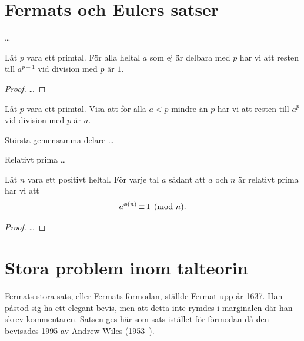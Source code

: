 \section{Fermats och Eulers satser}\label{sec:fermateuler}
\dots

\begin{theorem}
  Låt \(p\) vara ett primtal.
  För alla heltal \(a\) som ej är delbara med \(p\) har vi att resten till 
  \(a^{p-1}\) vid division med \(p\) är \(1\).
\end{theorem}
\begin{proof}
  \dots
\end{proof}

\begin{exercise}
  Låt \(p\) vara ett primtal.
  Visa att för alla \(a < p\) mindre än \(p\) har vi att resten till \(a^p\) 
  vid division med \(p\) är \(a\).
\end{exercise}

\begin{definition}
  Största gemensamma delare \dots
\end{definition}
\begin{definition}
  Relativt prima \dots
\end{definition}

\begin{theorem}
  Låt \(n\) vara ett positivt heltal.
  För varje tal \(a\) sådant att \(a\) och \(n\) är relativt prima har vi att 
  \[ a^{\phi(n)} \operatorname{\equiv} 1 \pmod n. \]
\end{theorem}
\begin{proof}
  \dots
\end{proof}


\section{Stora problem inom talteorin}

Fermats stora sats, eller Fermats förmodan, ställde Fermat upp år 1637.
Han påstod sig ha ett elegant bevis, men att detta inte rymdes i marginalen där 
han skrev kommentaren.
Satsen ges här som sats istället för förmodan då den bevisades 1995 av Andrew 
Wiles (1953--).

